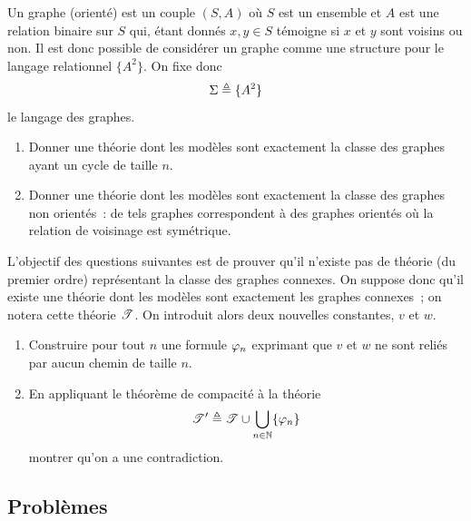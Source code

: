 \begin{exercise}
  Un graphe (orienté) est un couple $(S,A)$ où $S$ est un ensemble et $A$ est
  une relation binaire sur $S$ qui, étant donnés $x,y \in S$ témoigne si
  $x$ et $y$ sont voisins ou non. Il est donc possible de considérer un graphe
  comme une structure pour le langage relationnel $\{A^2\}$.
  On fixe donc \[\Sigma \triangleq \{A^2\}\] le langage des graphes.
  \begin{enumerate}[label = (\roman*)]
  \item Donner une théorie dont les modèles sont exactement la classe des
    graphes ayant un cycle de taille $n$.
  \item Donner une théorie dont les modèles sont exactement la classe des
    graphes non orientés~: de tels graphes correspondent à des graphes orientés
    où la relation de voisinage est symétrique.
  \end{enumerate}
  L'objectif des questions suivantes est de prouver qu'il n'existe pas de
  théorie (du premier ordre) représentant la classe des graphes connexes.
  On suppose donc qu'il existe une théorie dont les modèles sont exactement
  les graphes connexes~; on notera cette théorie $\mathscr T$. On introduit
  alors deux nouvelles constantes, $v$ et $w$.
  \begin{enumerate}[label=(\roman*),resume]
  \item Construire pour tout $n$ une formule $\varphi_n$ exprimant que $v$ et $w$
    ne sont reliés par aucun chemin de taille $n$.
  \item En appliquant le théorème de compacité à la théorie
    \[\mathscr T' \triangleq \mathscr T \cup \bigcup_{n \in \mathbb N} \{\varphi_n\}\]
    montrer qu'on a une contradiction.
  \end{enumerate}
\end{exercise}

\clearpage

\subsection{Problèmes}

